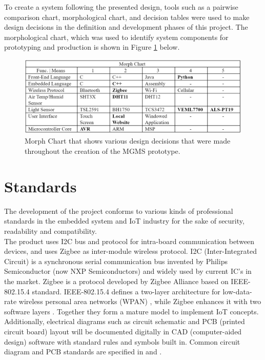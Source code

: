 \documentclass{report}
\begin{document}
To create a system following the presented design, tools such as a pairwise comparison chart, morphological chart, and decision tables were used to make design decisions in the definition and development phases of this project. The morphological chart, which was used to identify system components for prototyping and production is shown in Figure \ref{fig:Morph} below.
\begin{figure}[H] %
    \centering
    \includegraphics{PNGs/MorphChart.PNG}
    \caption{Morph Chart that shows various design decisions that were made throughout the creation of the MGMS prototype.}
    \label{fig:Morph}
\end{figure}

\section{Standards}
The development of the project conforms to various kinds of professional standards in the embedded system and IoT industry for the sake of security, readability and compatibility. \\

The product uses I2C bus and protocol for intra-board communication between devices, and uses Zigbee as inter-module wireless protocol. I2C (Inter-Integrated Circuit) is a synchronous serial communication bus invented by Philips Semiconductor (now NXP Semiconductors) \cite{noauthor_um10204_2014} and widely used by current IC's in the market. Zigbee is a protocol developed by Zigbee Alliance based on IEEE-802.15.4 standard. IEEE-802.15.4 defines a two-layer architecture for low-data-rate wireless personal area networks (WPAN) \cite{noauthor_ieee_2016}, while Zigbee enhances it with two software layers \cite{zigbee_alliance_zigbee_nodate}. Together they form a mature model to implement IoT concepts. \\

Additionally, electrical diagrams such as circuit schematic and PCB (printed circuit board) layout will be documented digitally in CAD (computer-aided design) software with standard rules and symbols built in. Common circuit diagram and PCB standards are specified in \cite{noauthor_ieee_1993} and \cite{noauthor_ieee_2020}. \\
\end{document}
